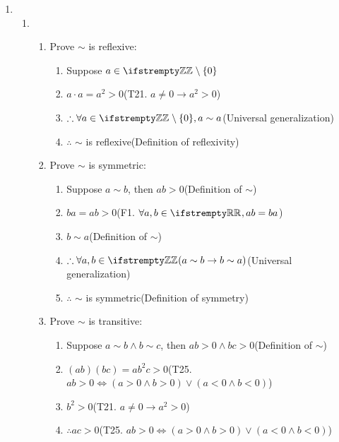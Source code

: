 \documentclass[12pt, a4paper]{article}
\begin{document}
\begin{enumerate}[Q\arabic*.]
  \pagebreak
  \item 
    \begin{enumerate}[(\alph*)]
      \item \begin{enumerate}[label=\arabic*., parsep=1em]
        \item Prove $\sim$ is reflexive:
          \begin{enumerate}[label=1.\arabic*., itemsep=-2em]
            \item Suppose $a \in \ZZ \setminus \{0\}$
            \item $a \cdot a = a^2 > 0$\hfill(T21. $a\neq0 \rightarrow a^2 > 0$)
            \item $\therefore \forall a \in \ZZ \setminus \{0\}, a \sim a$\hfill(Universal generalization)
            \item $\therefore$  $\sim$ is reflexive\hfill(Definition of reflexivity)
          \end{enumerate}
        \item Prove $\sim$ is symmetric:
          \begin{enumerate}[label=2.\arabic*., itemsep=-2em]
            \item Suppose $a \sim b$, then $ab > 0$\hfill(Definition of $\sim$)
            \item $ba = ab > 0$\hfill(F1. $\forall a, b \in \RR, ab = ba$)
            \item $b \sim a$\hfill(Definition of $\sim$)
            \item $\therefore \forall a, b \in \ZZ(a \sim b \rightarrow b \sim a)$\hfill(Universal generalization)
            \item $\therefore$ $\sim$ is symmetric\hfill(Definition of symmetry)
          \end{enumerate}
        \item Prove $\sim$ is transitive:
          \begin{enumerate}[label=3.\arabic*., itemsep=-2em]
            \item Suppose $a \sim b \land b \sim c$, then $ab > 0 \land bc > 0$\hfill(Definition of $\sim$)
            \item $(ab)(bc) =ab^2c > 0$\hfill(T25. $ab > 0 \iff (a>0 \land b > 0) \lor (a < 0 \land b < 0)$)
            \item $b^2 > 0$\hfill(T21. $a\neq 0 \rightarrow a^2 > 0$)
            \item $\therefore ac > 0$\hfill(T25. $ab > 0 \iff (a>0 \land b > 0) \lor (a < 0 \land b < 0)$)

\end{enumerate}
\end{enumerate}
\end{enumerate}
\end{enumerate}
\end{document}
